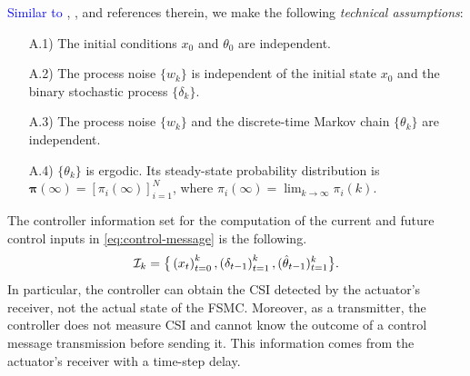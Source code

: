 \documentclass[journal,twoside,web]{ieeecolor}
\begin{document}
\textcolor{blue}{Similar to} \cite{yZL-2025-automatica}, \cite{impicciatore2024tac}, and references therein, we make the following \emph{technical assumptions}:
\begin{enumerate}
	\item[A.1)] The initial conditions $x_0$ and $\theta_0$ are independent. %
	\item[A.2)] The process noise $\{w_k\}$ is independent of the initial state $x_0$ and the binary stochastic process $\{\delta_k\}$.
	\item[A.3)] The process noise $\{w_k\}$ and the discrete-time Markov chain $\{\theta_k\}$ are independent.
	\item[A.4)] %
    $\{\theta_k\}$ is ergodic. Its steady-state probability distribution is $\bm{\pi}(\infty) = [\pi_{i}(\infty)]_{i=1}^{N}$, where $\pi_{i}(\infty) = \lim_{k\to\infty} \pi_{i}(k)$.
\end{enumerate}

The controller information set for the computation of the current and future control inputs in \eqref{eq:control-message} is the following.
	\begin{equation}\label{eq:info-set}
\text{\small $\mathcal{I}_{k} = \big\{
	\left(x_{t}\right)_{t=0}^{k}, 
	\left(\delta_{t-1}\right)_{t=1}^{k}, 
	(\hat{\theta}_{t-1})_{t=1}^{k} \big\}.$}
\end{equation}
In particular, the controller can obtain the CSI detected by the actuator's receiver, not the actual state of the FSMC. Moreover, as a transmitter, the controller does not measure CSI and cannot know the outcome of a control message transmission before sending it. This information comes from the actuator's receiver with a time-step delay.
\end{document}
